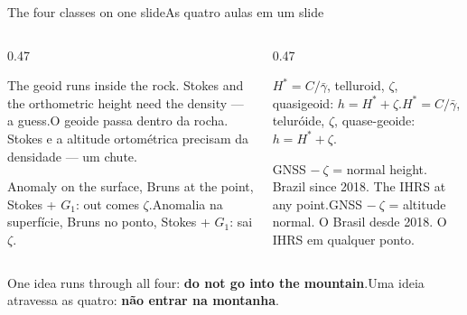 \documentclass[aspectratio=169,11pt]{beamer}
\newcommand{\tr}[2]{\ifEN#2\else#1\fi}
\newcommand{\bnum}[1]{\textbf{\textcolor{mTeal}{#1}}}
\begin{document}
\begin{frame}{\tr{As quatro aulas em um slide}{The four classes on one slide}}
  \begin{columns}[T]
    \begin{column}{0.47\textwidth}
      \begin{regra}[title={\tr{Aula 1 · O problema}{Class 1 · The problem}}]
        \small\tr{O geoide passa dentro da rocha. Stokes e a altitude ortométrica precisam da
        densidade --- um chute.}{The geoid runs inside the rock. Stokes and the orthometric
        height need the density --- a guess.}
      \end{regra}
      \vspace{2pt}
      \begin{regra}[title={\tr{Aula 3 · A conta}{Class 3 · The computation}}]
        \small\tr{Anomalia na superfície, Bruns no ponto, Stokes + $G_1$: sai $\zeta$.}{Anomaly
        on the surface, Bruns at the point, Stokes + $G_1$: out comes $\zeta$.}
      \end{regra}
    \end{column}
    \begin{column}{0.47\textwidth}
      \begin{regra}[title={\tr{Aula 2 · As palavras}{Class 2 · The words}}]
        \small\tr{$H^{*} = C/\bar\gamma$, teluróide, $\zeta$, quase-geoide: $h = H^{*} +
        \zeta$.}{$H^{*} = C/\bar\gamma$, telluroid, $\zeta$, quasigeoid: $h = H^{*} + \zeta$.}
      \end{regra}
      \vspace{2pt}
      \begin{regra}[title={\tr{Aula 4 · A prática}{Class 4 · The practice}}]
        \small\tr{GNSS $-\ \zeta$ = altitude normal. O Brasil desde 2018. O IHRS em qualquer
        ponto.}{GNSS $-\ \zeta$ = normal height. Brazil since 2018. The IHRS at any point.}
      \end{regra}
    \end{column}
  \end{columns}
  \medskip
  \centering
  \tr{Uma ideia atravessa as quatro: \bnum{não entrar na montanha}.}{One idea runs through all
  four: \bnum{do not go into the mountain}.}
\end{frame}
\end{document}
